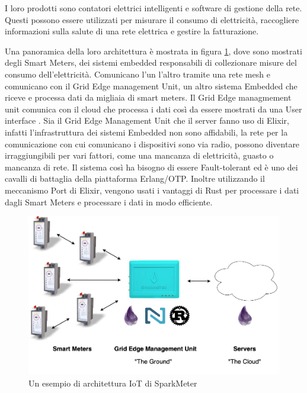 I loro prodotti sono contatori elettrici
intelligenti e software di gestione della rete.
Questi possono essere utilizzati per misurare
il consumo di elettricità, raccogliere informazioni
sulla salute di una rete elettrica e gestire
la fatturazione.

Una panoramica della loro architettura è mostrata
in figura \ref{fig:architettura_spark}, dove sono
mostrati degli Smart Meters, dei sistemi embedded
responsabili di collezionare misure del consumo
dell'elettricità. Comunicano l'un l'altro tramite
una rete mesh e comunicano con il Grid Edge
management Unit, un altro sistema Embedded che
riceve e processa dati da migliaia di smart meters.
Il Grid Edge managmement unit comunica con il cloud
che processa i dati così da essere mostrati
da una User interface \cite{Embedded35:online}.
Sia il Grid Edge Management Unit che il server
fanno uso di Elixir, infatti l'infrastruttura
dei sistemi Embedded non sono affidabili, 
la rete per la comunicazione con cui comunicano i
dispositivi sono via radio,
possono diventare irraggiungibili per vari fattori,
come una mancanza di elettricità, guasto o mancanza di rete.
Il sistema così ha bisogno di essere Fault-tolerant ed è
uno dei cavalli di battaglia della piattaforma Erlang/OTP.
Inoltre utilizzando il meccanismo Port di Elixir,
vengono usati i vantaggi di Rust per processare
i dati dagli Smart Meters e processare i dati
in modo efficiente.

\begin{figure}[!htp]
    \centering
    \includegraphics[keepaspectratio=true,scale=0.33]{images/sparkmeter-new-architecture.png}
	\caption{Un esempio di architettura IoT di SparkMeter\cite{Embedded35:online}}
  	\label{fig:architettura_spark}
\end{figure}



